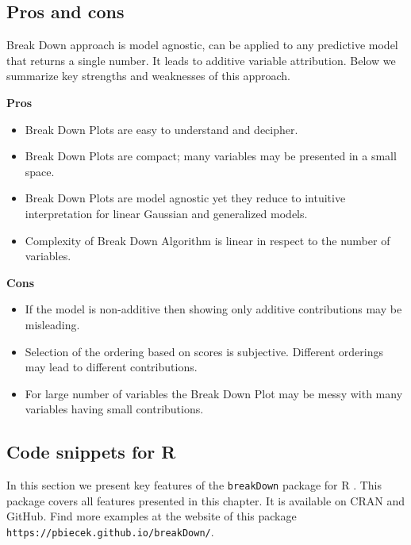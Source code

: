 \documentclass[]{krantz}
\providecommand{\tightlist}{%
  \setlength{\itemsep}{0pt}\setlength{\parskip}{0pt}}
\theoremstyle{definition}
\theoremstyle{definition}
\theoremstyle{definition}
\theoremstyle{remark}
\begin{document}
\hypertarget{pros-and-cons-1}{%
\subsection{Pros and cons}\label{pros-and-cons-1}}

Break Down approach is model agnostic, can be applied to any predictive
model that returns a single number. It leads to additive variable
attribution. Below we summarize key strengths and weaknesses of this
approach.

\textbf{Pros}

\begin{itemize}
\tightlist
\item
  Break Down Plots are easy to understand and decipher.
\item
  Break Down Plots are compact; many variables may be presented in a
  small space.
\item
  Break Down Plots are model agnostic yet they reduce to intuitive
  interpretation for linear Gaussian and generalized models.
\item
  Complexity of Break Down Algorithm is linear in respect to the number
  of variables.
\end{itemize}

\textbf{Cons}

\begin{itemize}
\tightlist
\item
  If the model is non-additive then showing only additive contributions
  may be misleading.
\item
  Selection of the ordering based on scores is subjective. Different
  orderings may lead to different contributions.
\item
  For large number of variables the Break Down Plot may be messy with
  many variables having small contributions.
\end{itemize}

\hypertarget{code-snippets-for-r}{%
\subsection{Code snippets for R}\label{code-snippets-for-r}}

In this section we present key features of the \texttt{breakDown}
package for R \citep{R-breakDown}. This package covers all features
presented in this chapter. It is available on CRAN and GitHub. Find more
examples at the website of this package
\texttt{https://pbiecek.github.io/breakDown/}.
\end{document}
